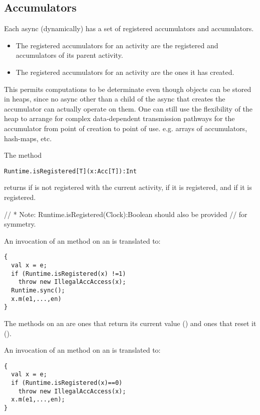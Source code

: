 \subsection{Accumulators}

Each async (dynamically) has a set of registered  accumulators
  and  accumulators.
  \begin{itemize}
  \item The registered  accumulators for an activity are the
    registered  and  accumulators of its parent activity.

  \item The registered  accumulators for an activity are the ones it has
    created. 
  \end{itemize}

 This permits computations to be determinate even though
 objects can be stored in heaps, since no async other than a child of
 the async that creates the accumulator can actually operate on
 them. One can still use the flexibility of the heap to arrange for
 complex data-dependent transmission pathways for the accumulator from
 point of creation to point of use. e.g.{} arrays of accumulators,
 hash-maps, etc.

The method 
\begin{lstlisting}
Runtime.isRegistered[T](x:Acc[T]):Int  
\end{lstlisting}

\noindent returns  if  is not registered with the
current activity,  if it is  registered, and  if
it is  registered.

//  * Note: Runtime.isRegistered(Clock):Boolean should also be provided
//    for symmetry.

An invocation  of an  method on an  is
  translated to: 
\begin{lstlisting}
{ 
  val x = e;
  if (Runtime.isRegistered(x) !=1) 
    throw new IllegalAccAccess(x);
  Runtime.sync();
  x.m(e1,...,en)
}      
\end{lstlisting}
The  methods on an  are ones that return its
current value () and ones that reset it ().

An invocation  of an  method on an 
 is translated to: 
\begin{lstlisting}
{ 
  val x = e;
  if (Runtime.isRegistered(x)==0) 
    throw new IllegalAccAccess(x);
  x.m(e1,...,en);
}    
\end{lstlisting}

